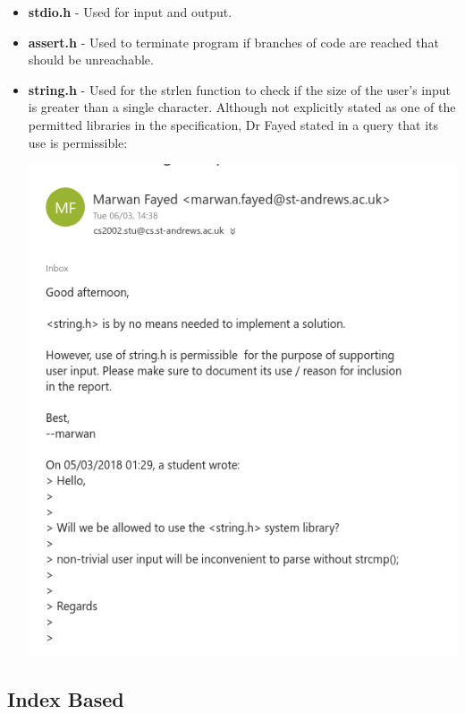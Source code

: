 \documentclass[11]{article}
\begin{document}
\begin{itemize}
					\item \textbf{stdio.h} - Used for input and output.
					
					\item \textbf{assert.h} - Used to terminate program if branches of code are reached that should be unreachable.
					
					\item \textbf{string.h} - Used for the strlen function to check if the size of the user's input is greater than a single character. Although not explicitly stated as one of the permitted libraries in the specification, Dr Fayed stated in a query that its use is permissible:
					
					\includegraphics[scale=0.4]{Email.png}
				\end{itemize}
		\subsection{Index Based}
\end{document}
